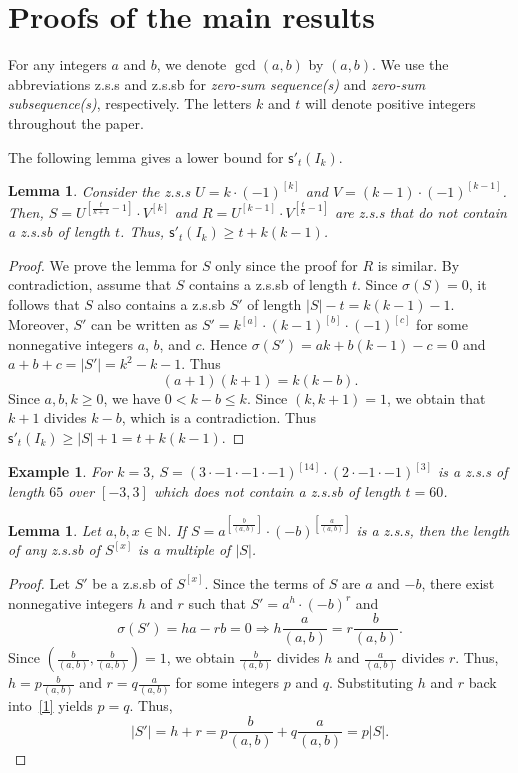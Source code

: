 \documentclass[12 pt]{amsart}
\newtheorem{lemma}[theorem]{Lemma}
\newtheorem{example}[theorem]{Example}
\def \n{\noindent }
\def \bs{\bigskip}
\def \N{\mathbb N}
\def \zs{z.s.s }
\def \zsb{z.s.s{\tiny b} }
\def \m{\mathsf{s}'}
\begin{document}
\section{Proofs of the main results}\label{sec:main}
For any integers $a$ and $b$, we denote $\gcd(a,b)$ by $(a,b)$. We use the abbreviations \zs and \zsb 
for {\em zero-sum sequence(s)} and {\em zero-sum subsequence(s)}, respectively. The letters $k$ and $t$ will denote positive integers throughout the paper. 

\bs\n The following lemma gives a lower bound for $\m_t(I_k)$.
%
\begin{lemma}\label{lem:3.0}
Consider the \zs $U=k\cdot(-1)^{[k]}$ and $V=(k-1)\cdot(-1)^{[k-1]}$.
Then, $S=U^{[\frac{t}{k+1}-1]}\cdot V^{[k]}$ and $R=U^{[k-1]}\cdot V^{[\frac{t}{k}-1]}$ are \zs that do not contain a \zsb of 
length $t$. Thus, $\m_t(I_k)\geq t+k(k-1)$.
\end{lemma}
%
\begin{proof}
We prove the lemma for $S$ only since the proof 
for  $R$ is similar. By contradiction, assume that  $S$ contains a \zsb of length $t$. Since
$\sigma(S)=0$, it follows that $S$ also contains
a \zsb $S'$ of length $|S|-t=k(k-1)-1$.
Moreover, $S'$ can be written as $S'=k^{[a]}\cdot (k-1)^{[b]}\cdot (-1)^{[c]}$ for some nonnegative integers $a$, $b$, and $c$. Hence 
$\sigma(S')=ak+b(k-1)-c=0$ and $a+b+c=|S'|=k^2-k-1$. Thus  
\[(a+1)(k+1)=k(k-b).\]
Since $a,b,k\geq 0$, we have $0<k-b\leq k$. Since $(k,k+1)=1$, we obtain that $k+1$ divides $k-b$, which is a contradiction.
Thus $\m_t(I_k)\geq |S|+1=t+k(k-1)$. 
\end{proof}
%
\begin{example} For $k=3$, $S =\left(3\cdot-1\cdot-1\cdot-1\right)^{[14]} \cdot \left(2\cdot-1\cdot-1\right)^{[3]}$ is a \zs of length 
$65$ over $[-3,3]$ which does not contain a \zsb  of length $t=60$. 
\end{example}
%
\begin{lemma}\label{lem:3.1} Let $a,b,x\in\N$.
If $S=a^{[\frac{b}{(a,b)}]}\cdot (-b)^{[\frac{a}{(a,b)}]}$ is a z.s.s, then the length of any \zsb of $S^{[x]}$ is a multiple of 
$\vert S\vert$.
\end{lemma}
%
\begin{proof}  
Let $S'$ be a \zsb of $S^{[x]}$. Since the terms of $S$ are $a$ 
and $-b$, there exist nonnegative integers $h$ and $r$ such that 
 $S'=a^{h}\cdot (-b)^{r}$ and
\begin{equation}\label{1}
\sigma(S')=ha-rb=0\Rightarrow h\dfrac{a}{(a,b)}=r\dfrac{b}{(a,b)}.
\end{equation}
Since $\left(\frac{b}{(a,b)},\frac{b}{(a,b)}\right)=1$, we obtain $\frac{b}{(a,b)}$ divides $h$ and $\frac{a}{(a,b)}$
divides $r$.  Thus, $h=p\frac{b}{(a,b)}$ and $r=q\frac{a}{(a,b)}$ for some integers $p$ and $q$.  Substituting $h$ and $r$ back into~\eqref{1} yields $p=q$. Thus,
\[|S'|=h+r=p\frac{b}{(a,b)}+q\frac{a}{(a,b)}=p|S|.\]
\end{proof}
\end{document}
